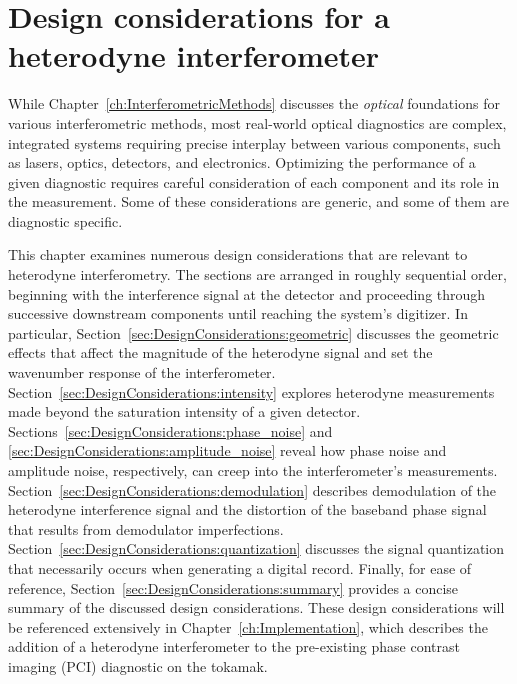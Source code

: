 \chapter{Design considerations for a heterodyne interferometer}
\label{ch:DesignConsiderations}
While Chapter~\ref{ch:InterferometricMethods} discusses the
\emph{optical} foundations for various interferometric methods,
most real-world optical diagnostics are complex, integrated systems
requiring precise interplay between various components, such as
lasers, optics, detectors, and electronics.
Optimizing the performance of a given diagnostic
requires careful consideration
of each component and its role in the measurement.
Some of these considerations are generic, and
some of them are diagnostic specific.

This chapter examines numerous design considerations
that are relevant to heterodyne interferometry.
The sections are arranged in roughly sequential order,
beginning with the interference signal at the detector and
proceeding through successive downstream components
until reaching the system's digitizer.
In particular, Section~\ref{sec:DesignConsiderations:geometric}
discusses the geometric effects that
affect the magnitude of the heterodyne signal and
set the wavenumber response of the interferometer.
Section~\ref{sec:DesignConsiderations:intensity}
explores heterodyne measurements made
beyond the saturation intensity of a given detector.
Sections~\ref{sec:DesignConsiderations:phase_noise} and
\ref{sec:DesignConsiderations:amplitude_noise}
reveal how phase noise and amplitude noise, respectively,
can creep into the interferometer's measurements.
Section~\ref{sec:DesignConsiderations:demodulation}
describes demodulation of the heterodyne interference signal and
the distortion of the baseband phase signal
that results from demodulator imperfections.
Section~\ref{sec:DesignConsiderations:quantization}
discusses the signal quantization
that necessarily occurs
when generating a digital record.
Finally, for ease of reference,
Section~\ref{sec:DesignConsiderations:summary}
provides a concise summary of the discussed design considerations.
These design considerations will be referenced extensively in
Chapter~\ref{ch:Implementation}, which
describes the addition of a heterodyne interferometer
to the pre-existing phase contrast imaging (PCI) diagnostic
on the \diiid\space tokamak.


